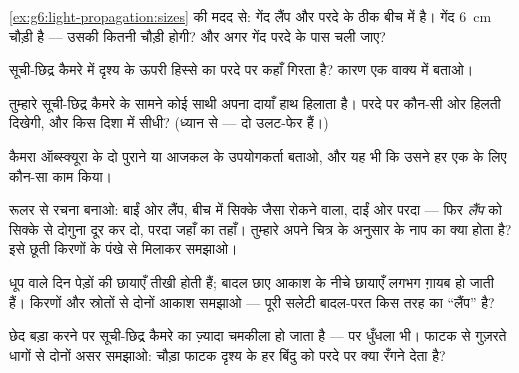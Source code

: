 \begin{exercise}[$\star$]\label{exo:g6:light-propagation:5}
\cref{ex:g6:light-propagation:sizes} की मदद से: गेंद लैंप और परदे के
ठीक बीच में है। गेंद \qty{6}{cm} चौड़ी है --- उसकी  कितनी चौड़ी
होगी? और अगर गेंद परदे के पास चली जाए?
\end{exercise}

\begin{exercise}[$\star$]\label{exo:g6:light-propagation:6}
सूची-छिद्र कैमरे में दृश्य के ऊपरी हिस्से का  परदे पर कहाँ
गिरता है? कारण एक वाक्य में बताओ।
\end{exercise}

\begin{exercise}[$\star$]\label{exo:g6:light-propagation:7}
तुम्हारे सूची-छिद्र कैमरे के सामने कोई साथी अपना दायाँ हाथ हिलाता है।
परदे पर कौन-सी ओर हिलती दिखेगी, और किस दिशा में सीधी? (ध्यान से ---
दो उलट-फेर हैं।)
\end{exercise}

\begin{exercise}[$\star$]\label{exo:g6:light-propagation:8}
कैमरा ऑब्स्क्यूरा के दो पुराने या आजकल के उपयोगकर्ता बताओ, और यह भी कि
उसने हर एक के लिए कौन-सा काम किया।
\end{exercise}

\begin{exercise}[$\star\star$]\label{exo:g6:light-propagation:9}
रूलर से रचना बनाओ: बाईं ओर लैंप, बीच में सिक्के जैसा रोकने वाला, दाईं
ओर परदा --- फिर \emph{लैंप} को सिक्के से दोगुना दूर कर दो, परदा जहाँ
का तहाँ। तुम्हारे अपने चित्र के अनुसार  के नाप का क्या होता है?
इसे छूती किरणों के पंखे से मिलाकर समझाओ।
\end{exercise}

\begin{exercise}[$\star\star$]\label{exo:g6:light-propagation:10}
धूप वाले दिन पेड़ों की छायाएँ तीखी होती हैं; बादल छाए आकाश के नीचे
छायाएँ लगभग ग़ायब हो जाती हैं। किरणों और स्रोतों से दोनों आकाश समझाओ
--- पूरी सलेटी बादल-परत किस तरह का ``लैंप'' है?
\end{exercise}

\begin{exercise}[$\star\star$]\label{exo:g6:light-propagation:11}
छेद बड़ा करने पर सूची-छिद्र कैमरे का  ज़्यादा चमकीला हो जाता
है --- पर धुँधला भी। फाटक से गुज़रते धागों से दोनों असर समझाओ: चौड़ा
फाटक दृश्य के हर बिंदु को परदे पर क्या रँगने देता है?
\end{exercise}

